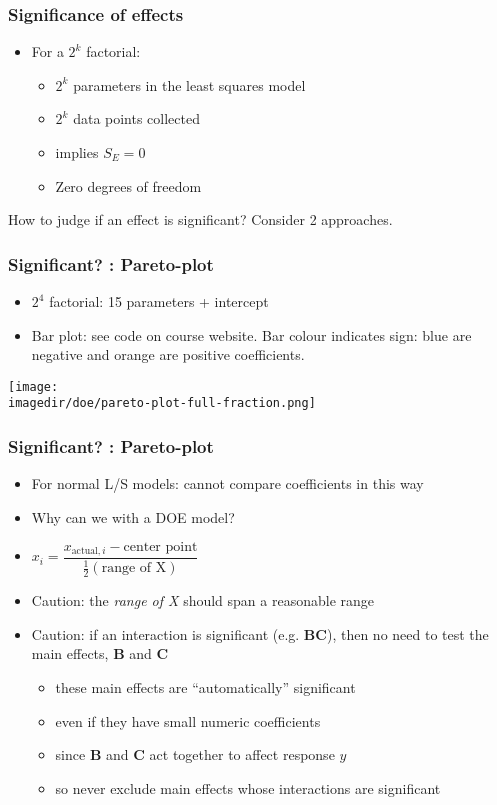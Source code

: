\begin{frame}\frametitle{Significance of effects}
	\begin{itemize}
		\item	For a $2^k$ factorial:
		\begin{itemize}
			\item	$2^k$ parameters in the least squares model
			\item	$2^k$ data points collected
			\item	implies $S_E = 0$
			\item	Zero degrees of freedom
		\end{itemize}
	\end{itemize}

	How to judge if an effect is significant? Consider 2 approaches.
\end{frame}

\begin{frame}\frametitle{Significant? : Pareto-plot}
	\begin{itemize}
		\item	$2^4$ factorial: 15 parameters + intercept
		\item	Bar plot: see code on course website. Bar colour indicates sign: blue are negative and orange are positive coefficients.
	\end{itemize}
	\begin{center}
		\texttt{[image: \\imagedir/doe/pareto-plot-full-fraction.png]}
	\end{center}
\end{frame}

\begin{frame}\frametitle{Significant? : Pareto-plot}
	\begin{itemize}
		\item	For normal L/S models: cannot compare coefficients in this way
		\item	Why can we with a DOE model?
		\item	$x_i = \dfrac{x_{\text{actual}, i}- \text{center point}}{\frac{1}{2} (\text{range of X})}$
		\item	Caution: the \emph{range of X} should span a reasonable range
	\end{itemize}
	\begin{itemize}
		\item	Caution: if an interaction is significant (e.g. \textbf{BC}), then no need to test the main effects, \textbf{B} and \textbf{C}
		\begin{itemize}
			\item	these main effects are ``automatically'' significant
			\item	even if they have small numeric coefficients
			\item	since \textbf{B} and \textbf{C} act together to affect response $y$
			\item	so never exclude main effects whose interactions are significant
		\end{itemize}
	\end{itemize}
\end{frame}

